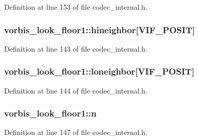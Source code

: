 Definition at line 153 of file codec\+\_\+internal.\+h.

\subsubsection[{\texorpdfstring{hineighbor}{hineighbor}}]{ vorbis\+\_\+look\+\_\+floor1\+::hineighbor\mbox{[}{\bf V\+I\+F\+\_\+\+P\+O\+S\+IT}\mbox{]}}\hypertarget{structvorbis__look__floor1_a81fcfd46dab832da0709459a76aa80e2}{}\label{structvorbis__look__floor1_a81fcfd46dab832da0709459a76aa80e2}


Definition at line 143 of file codec\+\_\+internal.\+h.

\subsubsection[{\texorpdfstring{loneighbor}{loneighbor}}]{ vorbis\+\_\+look\+\_\+floor1\+::loneighbor\mbox{[}{\bf V\+I\+F\+\_\+\+P\+O\+S\+IT}\mbox{]}}\hypertarget{structvorbis__look__floor1_ae5d2a437f26594d0b254b3b7c802377d}{}\label{structvorbis__look__floor1_ae5d2a437f26594d0b254b3b7c802377d}


Definition at line 144 of file codec\+\_\+internal.\+h.

\subsubsection[{\texorpdfstring{n}{n}}]{ vorbis\+\_\+look\+\_\+floor1\+::n}\hypertarget{structvorbis__look__floor1_ae51b0aedc2263f6f31d44299c283ab52}{}\label{structvorbis__look__floor1_ae51b0aedc2263f6f31d44299c283ab52}


Definition at line 147 of file codec\+\_\+internal.\+h.

